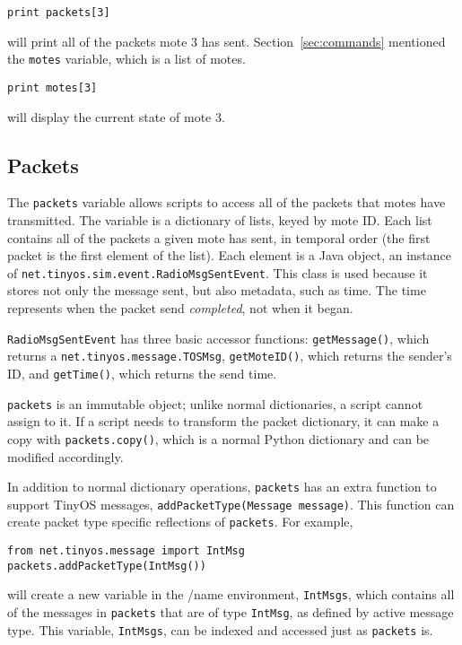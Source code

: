 \documentclass[10pt]{article}
\begin{document}
\begin{verbatim}
print packets[3]
\end{verbatim}

will print all of the packets mote 3 has sent. Section~\ref{sec:commands}
mentioned the {\tt motes} variable, which is a list of motes. 

\begin{verbatim}
print motes[3]
\end{verbatim}

will display the current state of mote 3.

\subsection{Packets}
\label{sec:packets}

The {\tt packets} variable allows scripts to access all of the packets
that motes have transmitted. The variable is a dictionary of lists, keyed
by mote ID. Each list contains all of the packets a given mote has sent, 
in temporal order (the first packet is the first element of the list). 
Each element is a Java object, an instance of 
{\tt net.tinyos.sim.event.RadioMsgSentEvent}. This class is used because
it stores not only the message sent, but also metadata, such as time. 
The time represents when the packet send {\it completed}, not when it 
began. 

{\tt RadioMsgSentEvent} has three basic accessor functions: {\tt getMessage()},
which returns a {\tt net.tinyos.message.TOSMsg}, 
{\tt getMoteID()}, which returns the sender's
ID, and {\tt getTime()}, which returns the send time.

{\tt packets} is an immutable object; unlike normal dictionaries, a
script cannot assign to it. If a script needs to transform the packet 
dictionary, it can make a copy with {\tt packets.copy()}, which is
a normal Python dictionary and can be modified accordingly.

In addition to normal dictionary operations, {\tt packets} has an extra
function to support TinyOS messages, {\tt addPacketType(Message message)}.
This function can create packet type specific reflections of {\tt packets}.
For example,

\begin{verbatim}
from net.tinyos.message import IntMsg
packets.addPacketType(IntMsg())
\end{verbatim}

will create a new variable in the /name environment, {\tt IntMsgs}, which
contains all of the messages in {\tt packets} that are of type {\tt IntMsg},
as defined by active message type. This variable, {\tt IntMsgs}, can
be indexed and accessed just as {\tt packets} is.
\end{document}
